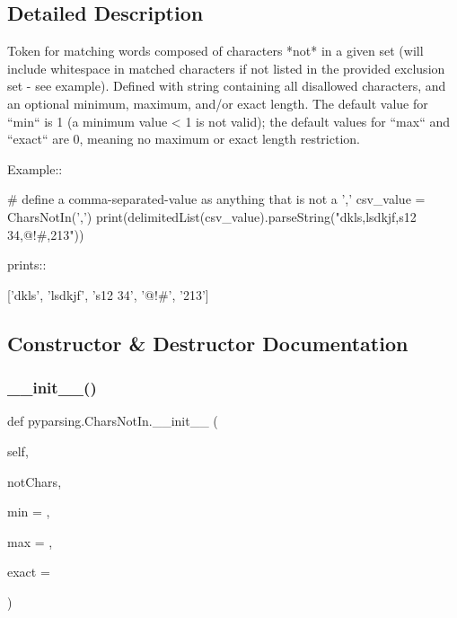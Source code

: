 \subsection{Detailed Description}
\begin{DoxyVerb}Token for matching words composed of characters *not* in a given
set (will include whitespace in matched characters if not listed in
the provided exclusion set - see example). Defined with string
containing all disallowed characters, and an optional minimum,
maximum, and/or exact length.  The default value for ``min`` is
1 (a minimum value < 1 is not valid); the default values for
``max`` and ``exact`` are 0, meaning no maximum or exact
length restriction.

Example::

    # define a comma-separated-value as anything that is not a ','
    csv_value = CharsNotIn(',')
    print(delimitedList(csv_value).parseString("dkls,lsdkjf,s12 34,@!#,213"))

prints::

    ['dkls', 'lsdkjf', 's12 34', '@!#', '213']
\end{DoxyVerb}
 

\subsection{Constructor \& Destructor Documentation}
\mbox{\label{classpyparsing_1_1CharsNotIn_a76ba70dcc5a900de66aaffbec6e591b6}} 
\subsubsection{\texorpdfstring{\+\_\+\+\_\+init\+\_\+\+\_\+()}{\_\_init\_\_()}}
{\footnotesize\ttfamily def pyparsing.\+Chars\+Not\+In.\+\_\+\+\_\+init\+\_\+\+\_\+ (\begin{DoxyParamCaption}\item[{}]{self,  }\item[{}]{not\+Chars,  }\item[{}]{min = {},  }\item[{}]{max = {},  }\item[{}]{exact = {} }\end{DoxyParamCaption})}




